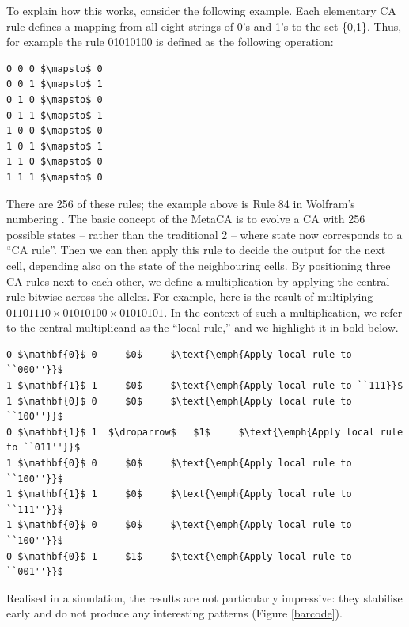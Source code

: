 \documentclass{AISB2008}
\newcommand{\droparrow}{%
  \mathchoice{\raisebox{-4pt}{$\displaystyle\mapsto$}}
             {\raisebox{-4pt}{$\mapsto$}}
             {\raisebox{-2pt}{$\scriptstyle\mapsto$}}
             {\raisebox{-2pt}{$\scriptscriptstyle\mapsto$}}}
\begin{document}
To explain how this works, consider the following example.  Each
elementary CA rule defines a mapping from all eight strings of 0's and
1's to the set \{0,1\}.  Thus, for example the rule 01010100 is defined as the following operation:
\begin{lstlisting}[mathescape]
0 0 0 $\mapsto$ 0
0 0 1 $\mapsto$ 1
0 1 0 $\mapsto$ 0
0 1 1 $\mapsto$ 1
1 0 0 $\mapsto$ 0
1 0 1 $\mapsto$ 1
1 1 0 $\mapsto$ 0
1 1 1 $\mapsto$ 0
\end{lstlisting}

There are 256 of these rules; the example above is Rule 84 in
Wolfram's numbering \cite{wolfram1994cellular}.  The basic concept of
the MetaCA is to evolve a CA with 256 possible states -- rather than
the traditional 2 -- where state now corresponds to a ``CA rule''.
Then we can then apply this rule to decide the output for the next
cell, depending also on the state of the neighbouring cells.  By
positioning three CA rules next to each other, we define a
multiplication by applying the central rule bitwise across the alleles.
%
For example, here is the result of multiplying $01101110\times
01010100\times 01010101$.  In the context of such a multiplication, we
refer to the central multiplicand as the ``local rule,'' and we
highlight it in bold below.

\lstset{
  xleftmargin=.1\columnwidth, xrightmargin=.01\columnwidth
}

\begin{lstlisting}[mathescape]
0 $\mathbf{0}$ 0     $0$     $\text{\emph{Apply local rule to ``000''}}$
1 $\mathbf{1}$ 1     $0$     $\text{\emph{Apply local rule to ``111}}$
1 $\mathbf{0}$ 0     $0$     $\text{\emph{Apply local rule to ``100''}}$
0 $\mathbf{1}$ 1  $\droparrow$   $1$     $\text{\emph{Apply local rule to ``011''}}$
1 $\mathbf{0}$ 0     $0$     $\text{\emph{Apply local rule to ``100''}}$
1 $\mathbf{1}$ 1     $0$     $\text{\emph{Apply local rule to ``111''}}$
1 $\mathbf{0}$ 0     $0$     $\text{\emph{Apply local rule to ``100''}}$
0 $\mathbf{0}$ 1     $1$     $\text{\emph{Apply local rule to ``001''}}$
\end{lstlisting}

Realised in a simulation, the results are not particularly impressive:
they stabilise early and do not produce any interesting patterns
(Figure \ref{barcode}).
\end{document}
